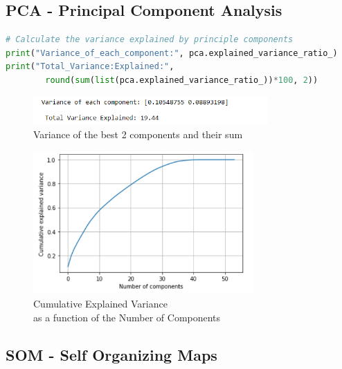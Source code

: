 \subsection{PCA - Principal Component Analysis} %
\label{sec:pca}

\begin{lstlisting}[language=Python]
# Calculate the variance explained by principle components
print("Variance_of_each_component:", pca.explained_variance_ratio_)
print("Total_Variance:Explained:", 
        round(sum(list(pca.explained_variance_ratio_))*100, 2))
\end{lstlisting}



\begin{figure}[h]
    \centering
    \includegraphics[width=0.8\textwidth,height=0.06\textheight]{Chapters/Figures/pca_2_comp_variance.png}
    \caption{Variance of the best 2 components and their sum}
    \label{fig:total_variance}
\end{figure}


\begin{figure}[h]
    \centering
    \includegraphics[width=0.75\textwidth,height=0.3\textheight]{Chapters/Figures/number_of_components.png}
    \caption{Cumulative Explained Variance\\ as a function of the Number of Components}
    \label{fig:variance_graph}
\end{figure}




\subsection{SOM - Self Organizing Maps} %
\label{sec:som}

